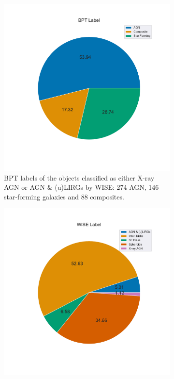 \documentclass[letterpaper, oneside]{article}
\begin{document}
	\begin{figure}[H]
		\centering
		\begin{subfigure}[b]{0.4\textwidth}
			\centering
			\includegraphics[width=\textwidth]{../WISE_plots/bpt_label_pie_wise_subsample.pdf}
			\caption{BPT labels of the objects classified as either X-ray AGN or AGN \& (u)LIRGs by WISE: 274 AGN, 146 star-forming galaxies and 88 composites.}
			\label{fig:T3_bpt_label_pie}
		\end{subfigure}
		\begin{subfigure}[b]{0.4\textwidth}
			\centering
			\includegraphics[width=\textwidth]{../WISE_plots/wise_label_pie_wise_subsample.pdf}

\end{subfigure}
\end{figure}
\end{document}
